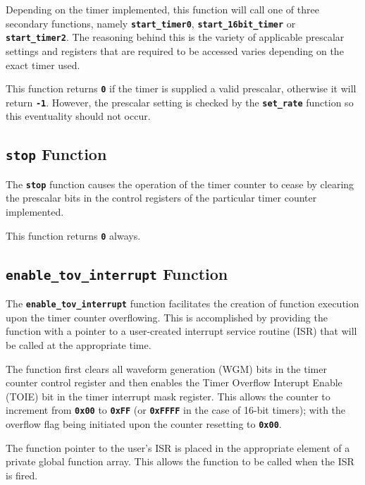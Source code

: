 \documentclass[a4paper, oneside, 11pt, titlepage, onecolumn, openright]{report}
\begin{document}
			Depending on the timer implemented, this function will call one of three secondary functions, namely \textbf{\texttt{start\_timer0}}, \textbf{\texttt{start\_16bit\_timer}} or \textbf{\texttt{start\_timer2}}. The reasoning behind this is the variety of applicable prescalar settings and registers that are required to be accessed varies depending on the exact timer used.
			
			This function returns \textbf{\texttt{0}} if the timer is supplied a valid prescalar, otherwise it will return \textbf{\texttt{-1}}. However, the prescalar setting is checked by the \textbf{\texttt{set\_rate}} function so this eventuality should not occur.
			
\subsection{\textbf{\texttt{stop}} Function}
			\label{ss:HALtcstopFunction}
			
			The \textbf{\texttt{stop}} function causes the operation of the timer counter to cease by clearing the prescalar bits in the control registers of the particular timer counter implemented.
			
			This function returns \textbf{\texttt{0}} always.
			
\subsection{\textbf{\texttt{enable\_tov\_interrupt}} Function}
			\label{ss:HALtcenable_tov_interruptFunction}
			
			The \textbf{\texttt{enable\_tov\_interrupt}} function facilitates the creation of function execution upon the timer counter overflowing. This is accomplished by providing the function with a pointer to a user-created interrupt service routine (ISR) that will be called at the appropriate time.
			
			The function first clears all waveform generation (WGM) bits in the timer counter control register and then enables the Timer Overflow Interupt Enable (TOIE) bit in the timer interrupt mask register. This allows the counter to increment from \textbf{\texttt{0x00}} to \textbf{\texttt{0xFF}} (or \textbf{\texttt{0xFFFF}} in the case of 16-bit timers); with the overflow flag being initiated upon the counter resetting to \textbf{\texttt{0x00}}.
			
			The function pointer to the user's ISR is placed in the appropriate element of a private global function array. This allows the function to be called when the ISR is fired.
			
\end{document}
